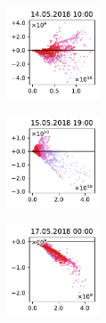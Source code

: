 \begin{figure}[H]
    \centering
    \begin{subfigure}
        \centering
        \includegraphics[width=0.30\textwidth,valign=t]{evaluation/figures/perturbations/perturbation-14.05.2018:10.00-temperature-add-2K.pdf}
    \end{subfigure}
    \begin{subfigure}
        \centering
        \includegraphics[width=0.30\textwidth,valign=t]{evaluation/figures/perturbations/perturbation-15.05.2018:19.00-temperature-add-2K.pdf}
    \end{subfigure}
    \begin{subfigure}
        \centering
        \includegraphics[width=0.30\textwidth,valign=t]{evaluation/figures/perturbations/perturbation-17.05.2018:00.00-temperature-add-2K.pdf}
    \end{subfigure}


\end{figure}
